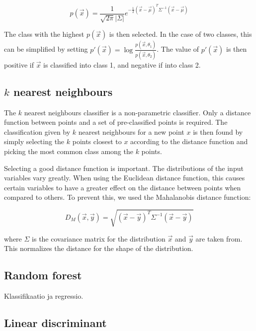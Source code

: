 \documentclass[twoside]{article}
\renewcommand{\v}[1]{\vec{#1}}
\begin{document}
\begin{multicols}{2}
\begin{equation}
 p(\v{x}) = \frac{1}{\sqrt{2\pi} |\Sigma|}e^{-\frac{1}{2}(\v{x}-\v{\mu})^T \Sigma^{-1} (\v{x}-\v{\mu})}
\end{equation}

The class with the highest $p(\v{x})$ is then selected. In the case of two classes,
this can be simplified by setting
$p'(\v{x}) = \log \frac{p(\v{x},\theta_1)}{p(\v{x},\theta_2)}$.
The value of $p'(\v{x})$ is then positive if $\v{x}$ is classified into class 1,
and negative if into class 2. 

\subsection{$k$ nearest neighbours}

The $k$ nearest neighbours classifier is a non-parametric classifier. Only a
distance function between points and a set of pre-classified points is required.
The classification given by $k$ nearest neighbours for a new point $x$ is then found by simply
selecting the $k$ points closest to $x$ according to the distance function and
picking the most common class among the $k$ points.

Selecting a good distance function is important. The distributions of the
input variables vary greatly. When using the Euclidean distance function,
this causes certain variables to have a greater effect on the distance between
points when compared to others. To prevent this, we used the Mahalanobis
distance function\cite[p.~88]{Alpaydin}:

\begin{equation}\label{eq:mahalanobis}
  D_M(\v{x}, \v{y}) = \sqrt{(\v{x}-\v{y})^T \Sigma^{-1} (\v{x}-\v{y})}
\end{equation}

where $\Sigma$ is the covariance matrix for the 
distribution $\v{x}$ and $\v{y}$ are taken from.
This normalizes the distance for the shape of the distribution.

\subsection{Random forest}

Klassifikaatio ja regressio.

\subsection{Linear discriminant}


\end{multicols}
\end{document}
